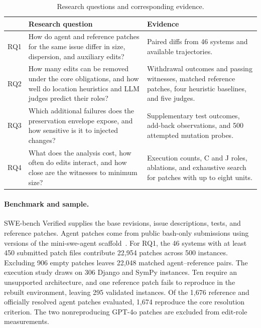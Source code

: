 \documentclass[a4paper,fleqn]{cas-sc}
\newcommand{\lab}[1]{\textsf{#1}}
\begin{document}
\begin{table}[pos=htbp]
\caption{Research questions and corresponding evidence.}
\label{tab:rqs}
\small\centering
\begin{tabularx}{\linewidth}{lXX}
\toprule
 & Research question & Evidence \\
\midrule
RQ1 & How do agent and reference patches for the same issue differ in size, dispersion, and auxiliary edits? & Paired diffs from 46 systems and available trajectories. \\
RQ2 & How many edits can be removed under the core obligations, and how well do location heuristics and LLM judges predict their roles? & Withdrawal outcomes and passing witnesses, matched reference patches, four heuristic baselines, and five judges. \\
RQ3 & Which additional failures does the preservation envelope expose, and how sensitive is it to injected changes? & Supplementary test outcomes, add-back observations, and 500 attempted mutation probes. \\
RQ4 & What does the analysis cost, how often do edits interact, and how close are the witnesses to minimum size? & Execution counts, \lab{C} and \lab{J} roles, ablations, and exhaustive search for patches with up to eight units. \\
\bottomrule
\end{tabularx}
\end{table}

\paragraph{Benchmark and sample.} SWE-bench Verified supplies the base revisions, issue descriptions, tests, and reference patches. Agent patches come from public bash-only submissions using versions of the mini-swe-agent scaffold~\citep{miniswe2025}. For RQ1, the 46 systems with at least 450 submitted patch files contribute 22,954 patches across 500 instances. Excluding 906 empty patches leaves 22,048 matched agent--reference pairs. The execution study draws on 306 Django and SymPy instances. Ten require an unsupported architecture, and one reference patch fails to reproduce in the rebuilt environment, leaving 295 validated instances. Of the 1,676 reference and officially resolved agent patches evaluated, 1,674 reproduce the core resolution criterion. The two nonreproducing GPT-4o patches are excluded from edit-role measurements.
\end{document}
